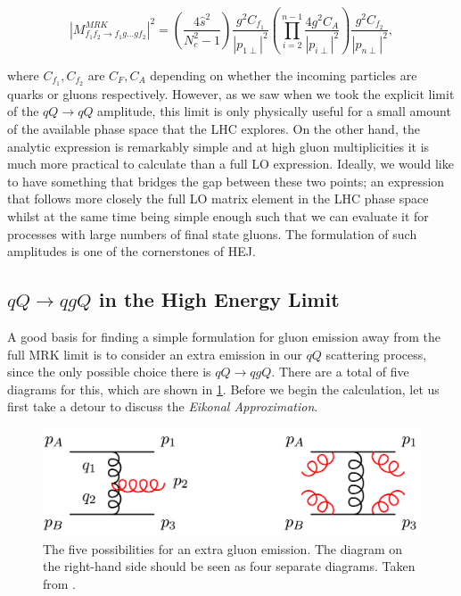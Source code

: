 \begin{equation}
|M^{MRK}_{f_1 f_2 \to f_1 g ... g f_2}|^2 = \left(\frac{4 \hat{s}^2}{N_c^2 - 1} \right) \frac{g^2 C_{f_1}}{|p_{1 \perp}|^2} \left(\prod_{i = 2}^{n-1} \frac{4 g^2 C_A}{|p_{i \perp}|^2} \right)  \frac{g^2 C_{f_2}}{|p_{n \perp}|^2} ,
\end{equation}

where $C_{f_1}, C_{f_2}$ are $C_F, C_A $ depending on whether the incoming particles are quarks or gluons respectively. However, as we saw when we took the explicit limit of the $qQ \to qQ$ amplitude, this limit is only physically useful for a small amount of the available phase space that the LHC explores. On the other hand, the analytic expression is remarkably simple and at high gluon multiplicities it is much more practical to calculate than a full LO expression. Ideally, we would like to have something that bridges the gap between these two points; an expression that follows more closely the full LO matrix element in the LHC phase space whilst at the same time being simple enough such that we can evaluate it for processes with large numbers of final state gluons. The formulation of such amplitudes is one of the cornerstones of HEJ. 

\subsection{$qQ \to qgQ$ in the High Energy Limit}

A good basis for finding a simple formulation for gluon emission away from the full MRK limit is to consider an extra emission in our $qQ$ scattering process, since the only possible choice there is $qQ \to qgQ$. There are a total of five diagrams for this, which are shown in \ref{fig:qQqgQ}. Before we begin the calculation, let us first take a detour to discuss the \emph{Eikonal Approximation}.

\begin{figure}[t]
\centering
\includegraphics[scale=0.3]{Images/gluon_emission.png} 
\caption{The five possibilities for an extra gluon emission. The diagram on the right-hand side should be seen as four separate diagrams. Taken from \cite{Andersen2009a}.}
\label{fig:qQqgQ}
\end{figure}

